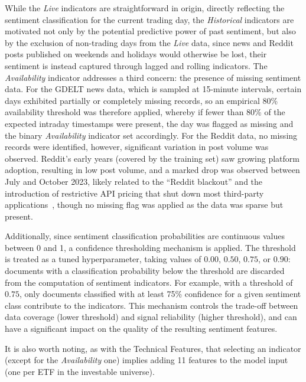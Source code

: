 While the \textit{Live} indicators are straightforward in origin, directly reflecting the sentiment classification for the current trading day, the \textit{Historical} indicators are motivated not only by the potential predictive power of past sentiment, but also by the exclusion of non-trading days from the \textit{Live} data, since news and Reddit posts published on weekends and holidays would otherwise be lost, their sentiment is instead captured through lagged and rolling indicators. The \textit{Availability} indicator addresses a third concern: the presence of missing sentiment data. For the GDELT news data, which is sampled at 15-minute intervals, certain days exhibited partially or completely missing records, so an empirical 80\% availability threshold was therefore applied, whereby if fewer than 80\% of the expected intraday timestamps were present, the day was flagged as missing and the binary \textit{Availability} indicator set accordingly. For the Reddit data, no missing records were identified, however, significant variation in post volume was observed. Reddit's early years (covered by the training set) saw growing platform adoption, resulting in low post volume, and a marked drop was observed between July and October 2023, likely related to the ``Reddit blackout'' and the introduction of restrictive API pricing that shut down most third-party applications~\cite{redditblackout2023}, though no missing flag was applied as the data was sparse but present.

Additionally, since sentiment classification probabilities are continuous values between 0 and 1, a confidence thresholding mechanism is applied. The threshold is treated as a tuned hyperparameter, taking values of $0.00$, $0.50$, $0.75$, or $0.90$: documents with a classification probability below the threshold are discarded from the computation of sentiment indicators. For example, with a threshold of $0.75$, only documents classified with at least 75\% confidence for a given sentiment class contribute to the indicators. This mechanism controls the trade-off between data coverage (lower threshold) and signal reliability (higher threshold), and can have a significant impact on the quality of the resulting sentiment features.

It is also worth noting, as with the Technical Features, that selecting an indicator (except for the \textit{Availability} one) implies adding 11 features to the model input (one per ETF in the investable universe).

